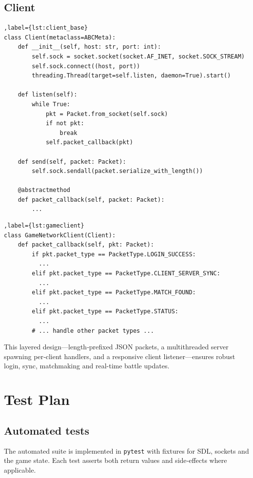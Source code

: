 \documentclass[11pt,a4paper]{article}
\begin{document}
\subsection{Client}
\begin{lstlisting}[caption={Abstract \texttt{Client} base}],label={lst:client_base}
class Client(metaclass=ABCMeta):
    def __init__(self, host: str, port: int):
        self.sock = socket.socket(socket.AF_INET, socket.SOCK_STREAM)
        self.sock.connect((host, port))
        threading.Thread(target=self.listen, daemon=True).start()

    def listen(self):
        while True:
            pkt = Packet.from_socket(self.sock)
            if not pkt:
                break
            self.packet_callback(pkt)

    def send(self, packet: Packet):
        self.sock.sendall(packet.serialize_with_length())

    @abstractmethod
    def packet_callback(self, packet: Packet):
        ...
\end{lstlisting}

\begin{lstlisting}[caption={\texttt{GameNetworkClient} example usage}],label={lst:gameclient}
class GameNetworkClient(Client):
    def packet_callback(self, pkt: Packet):
        if pkt.packet_type == PacketType.LOGIN_SUCCESS:
          ...
        elif pkt.packet_type == PacketType.CLIENT_SERVER_SYNC:
          ...
        elif pkt.packet_type == PacketType.MATCH_FOUND:
          ...
        elif pkt.packet_type == PacketType.STATUS:
          ...
        # ... handle other packet types ...
\end{lstlisting}

This layered design—length‐prefixed JSON packets, a multithreaded server spawning per‐client handlers, and a responsive client listener—ensures robust login, sync, matchmaking and real-time battle updates.

\section{Test Plan}

\subsection{Automated tests}
The automated suite is implemented in \texttt{pytest} with fixtures for SDL, sockets and the game state. Each test asserts both return values and side‐effects where applicable.
\end{document}
